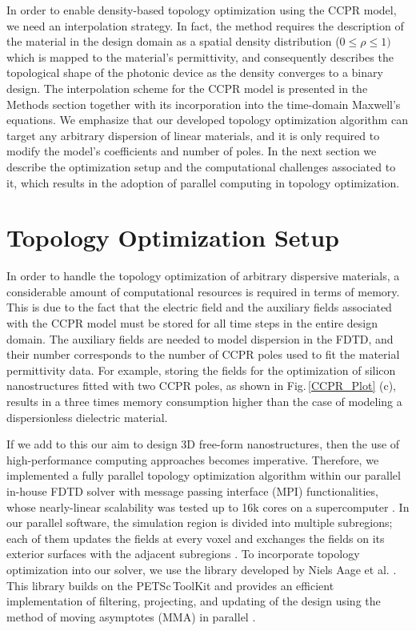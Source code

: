 \documentclass[aps,prl,twocolumn,superscriptaddress,longbibliography]{revtex4-1}
\begin{document}
In order to enable density-based topology optimization using the CCPR model, we need an interpolation strategy. In fact, 
the method requires the description of the material in the design domain as a spatial density distribution ($0\le\rho\le1)$ which is mapped to the material's permittivity, and consequently describes the topological shape of the photonic device as the density converges to a binary design. The interpolation scheme for the CCPR model is presented in the Methods section together with its incorporation into the time-domain Maxwell's equations. 
We emphasize that our developed topology optimization algorithm can target any arbitrary dispersion of linear materials, and it is only required to modify the model's coefficients and number of poles. In the next section we describe the optimization setup and the computational challenges associated to it, which results in the adoption of parallel computing in topology optimization. 

\section{Topology Optimization Setup}\label{Sec:2}

In order to handle the topology optimization of arbitrary dispersive materials, a considerable amount of computational resources is required in terms of memory. This is due to the fact that the electric field and the auxiliary fields associated with the CCPR model must be stored for all time steps in the entire design domain. The auxiliary fields are needed to model dispersion in the FDTD, and their number corresponds to the number of CCPR poles used to fit the material permittivity data. For example, storing the fields for the optimization of silicon nanostructures fitted with two CCPR poles, as shown in Fig.\,\ref{CCPR_Plot} (c), results in a three times memory consumption higher than the case of modeling a dispersionless dielectric material.

\par 
If we add to this our aim to design 3D free-form nanostructures, then the use of high-performance computing approaches becomes imperative.
Therefore, we implemented a fully parallel topology optimization algorithm within our parallel in-house FDTD solver with message passing interface (MPI) functionalities, whose nearly-linear scalability was tested up to 16k cores on a supercomputer \cite{convergence}. In our parallel software, the simulation region is divided into multiple subregions; each of them updates the fields at every voxel and exchanges the fields on its exterior surfaces with the adjacent subregions \cite{parallelism}. 
To incorporate topology optimization into our solver, we use the library developed by Niels Aage et al. \cite{petscTopOpt}.
This library builds on the PETSc\,ToolKit and provides an efficient implementation of filtering, projecting, and updating of the design using the method of moving asymptotes (MMA) in parallel \cite{MMA_Parallel}.
\end{document}
